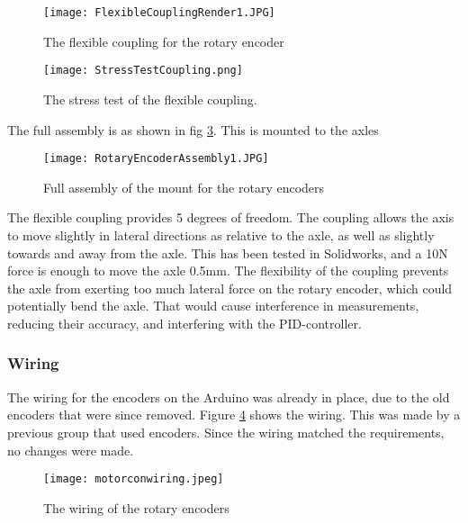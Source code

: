 \begin{figure}[H]
\centering
\texttt{[image: FlexibleCouplingRender1.JPG]}
\caption{The flexible coupling for the rotary encoder}
\label{fig::FCR}
\end{figure}

\begin{figure}[H]
\centering
\texttt{[image: StressTestCoupling.png]}
\caption{The stress test of the flexible coupling.}
\label{fig::FCR}
\end{figure}

The full assembly is as shown in fig \ref{fig::REA}.
This is mounted to the axles 

\begin{figure}[H]
\centering
\texttt{[image: RotaryEncoderAssembly1.JPG]}
\caption{Full assembly of the mount for the rotary encoders}
\label{fig::REA}
\end{figure}

The flexible coupling provides 5 degrees of freedom.
The coupling allows the axis to move slightly in lateral directions as relative to the axle, as well as slightly towards and away from the axle.
This has been tested in Solidworks, and a 10N force is enough to move the axle 0.5mm.
The flexibility of the coupling prevents the axle from exerting too much lateral force on the rotary encoder, which could potentially bend the axle.
That would cause interference in measurements, reducing their accuracy, and interfering with the PID-controller.

\subsubsection{Wiring}
The wiring for the encoders on the Arduino was already in place, due to the old encoders that were since removed.
Figure \ref{fig::WD} shows the wiring.
This was made by a previous group that used encoders.
Since the wiring matched the requirements, no changes were made.

\begin{figure}[H]
\centering
\texttt{[image: motorconwiring.jpeg]}
\caption{The wiring of the rotary encoders}
\label{fig::WD}
\end{figure}

\newpage
